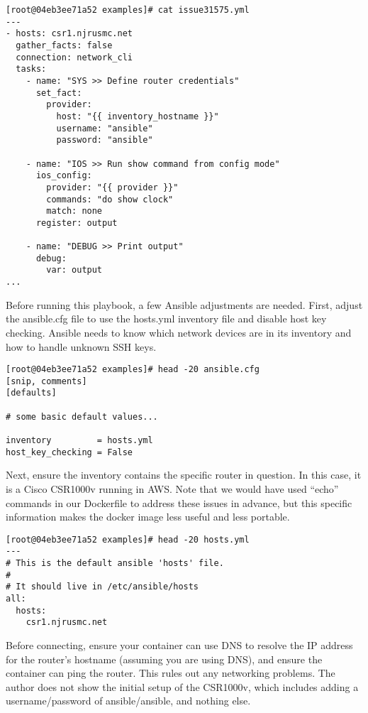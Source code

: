 \begin{verbatim}
[root@04eb3ee71a52 examples]# cat issue31575.yml
---
- hosts: csr1.njrusmc.net
  gather_facts: false
  connection: network_cli
  tasks:
    - name: "SYS >> Define router credentials"
      set_fact:
        provider:
          host: "{{ inventory_hostname }}" 
          username: "ansible"
          password: "ansible"

    - name: "IOS >> Run show command from config mode" 
      ios_config:
        provider: "{{ provider }}"
        commands: "do show clock"
        match: none
      register: output

    - name: "DEBUG >> Print output"
      debug:
        var: output
...
\end{verbatim}

Before running this playbook, a few Ansible adjustments are needed. First,
adjust the ansible.cfg file to use the hosts.yml inventory file and disable
host key checking. Ansible needs to know which network devices are in its
inventory and how to handle unknown SSH keys.

\begin{verbatim}
[root@04eb3ee71a52 examples]# head -20 ansible.cfg 
[snip, comments]
[defaults]

# some basic default values...

inventory         = hosts.yml
host_key_checking = False
\end{verbatim}

Next, ensure the inventory contains the specific router in question. In this
case, it is a Cisco CSR1000v running in AWS. Note that we would have used
``echo'' commands in our Dockerfile to address these issues in advance, but this
specific information makes the docker image less useful and less portable.

\begin{verbatim}
[root@04eb3ee71a52 examples]# head -20 hosts.yml
---
# This is the default ansible 'hosts' file.
#
# It should live in /etc/ansible/hosts
all:
  hosts:
    csr1.njrusmc.net
\end{verbatim}

Before connecting, ensure your container can use DNS to resolve the IP address
for the router's hostname (assuming you are using DNS), and ensure the
container can ping the router. This rules out any networking problems. The
author does not show the initial setup of the CSR1000v, which includes adding
a username/password of ansible/ansible, and nothing else.

